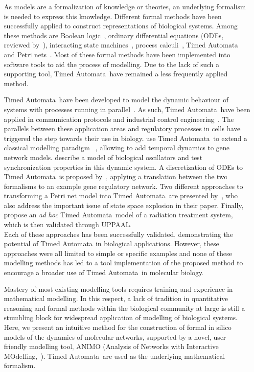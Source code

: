 \documentclass{bmcart}
\def\tas{Timed Automata}
\begin{document}
As models are a formalization of knowledge or theories, an underlying formalism is needed to express
this knowledge. Different formal methods have been successfully applied to construct representations
of biological systems. Among these methods are Boolean logic~\cite{boolean-networks-flower,boolean-networks2},
ordinary differential equations (ODEs, reviewed by~\cite[]{hidde-review}),
interacting state machines~\cite{interacting-sm1,interacting-sm2},
process calculi~\cite{blenx,bio-pepa}, Timed Automata~\cite{ta-siebert,bartocci-oscillators,
oded-ode-ta-discretization} and Petri nets~\cite{petri-nets,petri-nets2}.
Most of these formal methods have been implemented into software tools to aid the process
of modelling. Due to the lack of such a supporting tool, \tas\ have remained a less 
frequently applied method.

\tas\ have been developed to model the dynamic behaviour of systems with processes running in parallel~\cite{timed-automata-alur-dill}. 
As such, \tas\ have been applied in communication protocols and industrial control engineering~\cite{ta-audio-protocol,ta-wap-gateway,ta-ws-bap}. The 
parallels between these application areas and regulatory processes in cells have triggered the step towards 
their use in biology.
\cite{ta-siebert} use \tas\ to extend a classical modelling paradigm
~\cite{thomas-formalism}, allowing to add temporal dynamics to gene network models.
\cite{bartocci-oscillators} describe a model of biological oscillators and test 
synchronization properties in this dynamic system.
A discretization of ODEs to \tas\ is proposed by~\cite{oded-ode-ta-discretization}, applying
a translation between the two formalisms to an example gene regulatory network. Two 
different approaches to transforming
a Petri net model into \tas\ are presented by~\cite{ta-giapponesi},
who also address the important issue of state space explosion in their paper.
Finally, \cite{ta-radiazioni} propose an \emph{ad hoc} \tas\ model of a radiation treatment
system, which is then validated through UPPAAL.\\
Each of these approaches has been successfully validated, demonstrating the potential of \tas\
in biological applications. However, these approaches were all limited to simple
or specific examples and none of these modelling methods
has led to a tool implementation of the proposed method to encourage a broader use
of \tas\ in molecular biology.

Mastery of most existing modelling tools requires training and experience in mathematical modelling. 
In this respect, a lack of tradition in quantitative
reasoning and formal methods within the biological community at large is still a stumbling block for
widespread application of modelling of biological systems. Here, we present an intuitive method for the
construction of formal in silico models of the dynamics of molecular networks, supported by a novel,
user friendly modelling tool, ANIMO (Analysis of Networks with Interactive 
MOdelling,~\cite[]{animo-bibe}). \tas\ are used as the underlying mathematical formalism.
\end{document}
